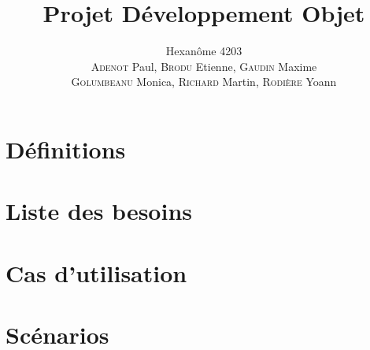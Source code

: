 


\title{\textbf{Projet Développement Objet}}
\author{Hexanôme 4203\\
\textsc{Adenot} Paul, \textsc{Brodu} Etienne, \textsc{Gaudin} Maxime\\
\textsc{Golumbeanu} Monica, \textsc{Richard} Martin, \textsc{Rodière} Yoann}

\graphicspath{{./img/}{../img/}{../../img/}{../../../img/}}


	\maketitle
	\tableofcontents

	\newpage
	\part{Définitions}
	
	

	\newpage
	\part{Liste des besoins}
	
	

	\newpage
	\part{Cas d'utilisation}
	
	

	\newpage
	\part{Scénarios}
	
	

